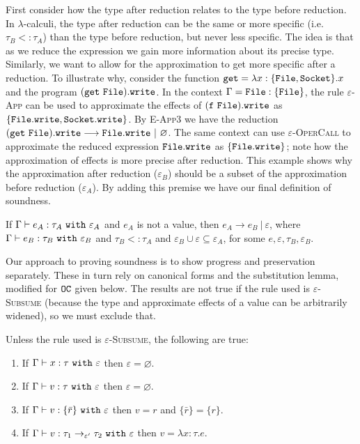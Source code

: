 First consider how the type after reduction relates to the type before reduction. In $\lambda$-calculi, the type after reduction can be the same or more specific (i.e. $\tau_B <: \tau_A$) than the type before reduction, but never less specific. The idea is that as we reduce the expression we gain more information about its precise type. Similarly, we want to allow for the approximation to get more specific after a reduction. To illustrate why, consider the function $\mathtt{get} = \lambda x: \{ \mathtt{File, Socket} \} .x$ and the program $\mathtt{(get~File).write}$. In the context $\Gamma = \mathtt{File: \{ File \}}$, the rule \textsc{$\varepsilon$-App} can be used to approximate the effects of $\mathtt{(f~File).write}$ as $\{ \mathtt{File.write, Socket.write} \}$. By \textsc{E-App3} we have the reduction $\mathtt{(get~File).write} \longrightarrow \mathtt{File.write}~|~\varnothing$. The same context can use \textsc{$\varepsilon$-OperCall} to approximate the reduced expression $\mathtt{File.write}$ as $\{ \mathtt{File.write} \}$; note how the approximation of effects is more precise after reduction. This example shows why the approximation after reduction ($\varepsilon_B$) should be a subset of the approximation before reduction ($\varepsilon_A$). By adding this premise we have our final definition of soundness.

\begin{theorem}
If $ \Gamma \vdash  e_A:  \tau_A~\mathtt{with}~ \varepsilon_A$ and $ e_A$ is not a value, then $e_A \longrightarrow e_B~|~\varepsilon$, where $ \Gamma \vdash e_B:  \tau_B~\mathtt{with}~ \varepsilon_B$ and $ \tau_B <:  \tau_A$ and $\varepsilon_B \cup \varepsilon \subseteq \varepsilon_A$, for some $e, \varepsilon, \tau_B, \varepsilon_B$.
\end{theorem}

Our approach to proving soundness is to show progress and preservation separately. These in turn rely on canonical forms and the substitution lemma, modified for $\mathtt{OC}$ given below. The results are not true if the rule used is \textsc{$\varepsilon$-Subsume} (because the type and approximate effects of a value can be arbitrarily widened), so we must exclude that.

\begin{lemma}
Unless the rule used is \textsc{$\varepsilon$-Subsume}, the following are true:
\begin{enumerate}
	\setlength\itemsep{-0.7em}
	\item If $\Gamma \vdash x: \tau~\mathtt{with}~ \varepsilon$ then $\varepsilon = \varnothing$.
	\item If $ \Gamma \vdash  v:  \tau~\mathtt{with}~ \varepsilon$ then $\varepsilon = \varnothing$.
	\item If $ \Gamma \vdash v: \{ \bar r \}~\mathtt{with}~ \varepsilon$ then $v = r$ and $\{ \bar r \} = \{ r \}$.
	\item If $\Gamma \vdash v: \tau_1 \rightarrow_{\varepsilon'} \tau_2~\mathtt{with}~ \varepsilon$ then $v = \lambda x:\tau. e$.
\end{enumerate}
\end{lemma}

